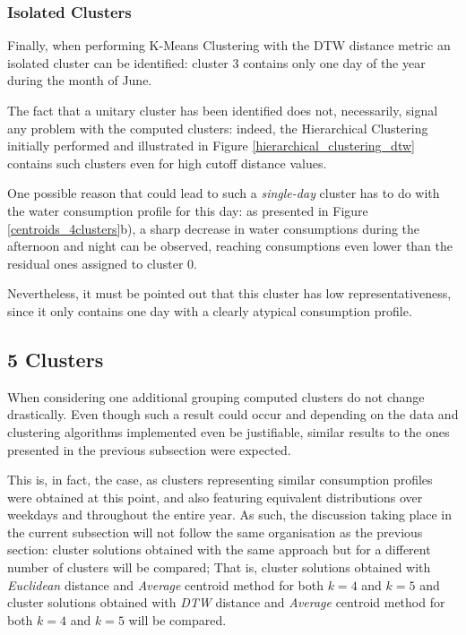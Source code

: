 \documentclass[9pt,journal,compsoc]{IEEEtran}
\begin{document}
\subsubsection{Isolated Clusters}
\label{isolated_clusters}

Finally, when performing K-Means Clustering with the DTW distance metric an isolated cluster can be identified: cluster $3$ contains only one day of the year during the month of June.

The fact that a unitary cluster has been identified does not, necessarily, signal any problem with the computed clusters: indeed, the Hierarchical Clustering initially performed and illustrated in Figure \ref{hierarchical_clustering_dtw} contains such clusters even for high cutoff distance values.

One possible reason that could lead to such a \emph{single-day} cluster has to do with the water consumption profile for this day: as presented in Figure \ref{centroids_4clusters}b), a sharp decrease in water consumptions during the afternoon and night can be observed, reaching consumptions even lower than the residual ones assigned to cluster $0$.

Nevertheless, it must be pointed out that this cluster has low representativeness, since it only contains one day with a clearly atypical consumption profile. 

\subsection{5 Clusters}
\label{5_clusters}

When considering one additional grouping computed clusters do not change drastically. Even though such a result could occur and depending on the data and clustering algorithms implemented even be justifiable, similar results to the ones presented in the previous subsection were expected.

This is, in fact, the case, as clusters representing similar consumption profiles were obtained at this point, and also featuring equivalent distributions over weekdays and throughout the entire year. As such, the discussion taking place in the current subsection will not follow the same organisation as the previous section: cluster solutions obtained with the same approach but for a different number of clusters will be compared; That is, cluster solutions obtained with \emph{Euclidean} distance and \emph{Average} centroid method for both $k=4$ and $k=5$ and cluster solutions obtained with \emph{DTW} distance and \emph{Average} centroid method for both $k=4$ and $k=5$ will be compared.
\end{document}
